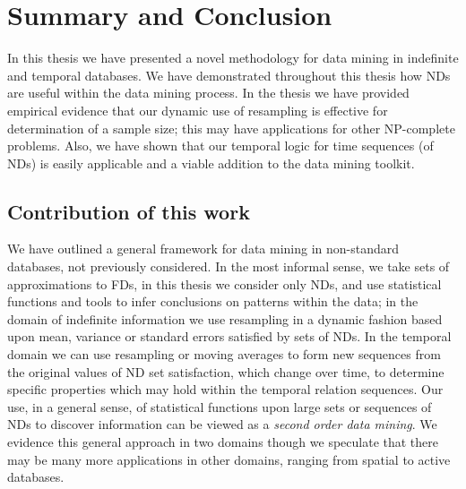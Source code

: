 \chapter{Summary and Conclusion}\label{chap:conclusion}

In this thesis we have presented a novel methodology for data
mining in indefinite and temporal databases. We have demonstrated
throughout this thesis how NDs are useful within the data mining
process. In the thesis we have provided empirical
evidence that our dynamic use of resampling is effective for
determination of a sample size; this may have applications for other
NP-complete problems. Also, we have shown that our temporal logic for
time sequences (of NDs) is easily applicable and a viable addition to
the data mining toolkit. 



\section{Contribution of this work}\label{sec:conc_contrib}

We have outlined a general framework for data mining in non-standard
databases, not previously considered. In the most informal sense, we
take sets of approximations to FDs, in this thesis we consider only
NDs, and use statistical functions and tools to infer conclusions on
patterns within the data; in the domain of indefinite information we
use resampling in a dynamic fashion based upon mean, variance
or standard errors satisfied by sets of NDs. In the temporal
domain we can use resampling or moving averages to form new sequences
from the original values of ND set satisfaction, which change over
time, to determine specific properties which may hold within the
temporal relation sequences. Our use, in a general sense, of
statistical functions upon large sets or sequences of NDs to discover
information can be viewed as a {\em second order data
mining}. We evidence this general approach in two domains though we
speculate that there may be many more applications in other domains,
ranging from spatial to active databases.

\medskip

